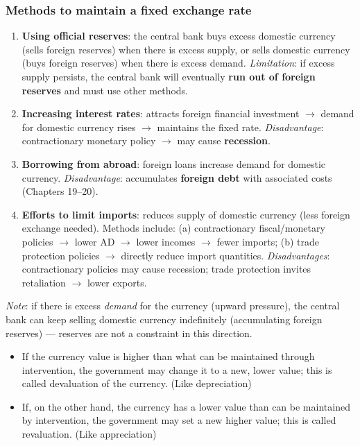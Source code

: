 \subsubsection*{Methods to maintain a fixed exchange rate}
\begin{enumerate}
  \item \textbf{Using official reserves}: the central bank buys excess domestic currency (sells foreign reserves) when there is excess supply, or sells domestic currency (buys foreign reserves) when there is excess demand. \textit{Limitation}: if excess supply persists, the central bank will eventually \textbf{run out of foreign reserves} and must use other methods.
  \item \textbf{Increasing interest rates}: attracts foreign financial investment $\to$ demand for domestic currency rises $\to$ maintains the fixed rate. \textit{Disadvantage}: contractionary monetary policy $\to$ may cause \textbf{recession}.
  \item \textbf{Borrowing from abroad}: foreign loans increase demand for domestic currency. \textit{Disadvantage}: accumulates \textbf{foreign debt} with associated costs (Chapters 19--20).
  \item \textbf{Efforts to limit imports}: reduces supply of domestic currency (less foreign exchange needed). Methods include: (a) contractionary fiscal/monetary policies $\to$ lower AD $\to$ lower incomes $\to$ fewer imports; (b) trade protection policies $\to$ directly reduce import quantities. \textit{Disadvantages}: contractionary policies may cause recession; trade protection invites retaliation $\to$ lower exports.
\end{enumerate}
\textit{Note}: if there is excess \textit{demand} for the currency (upward pressure), the central bank can keep selling domestic currency indefinitely (accumulating foreign reserves) --- reserves are not a constraint in this direction.
\begin{itemize}
  \item If the currency value is higher than what can be maintained through intervention, the government may change it to a new, lower value; this is called devaluation of the currency. (Like depreciation)
  \item If, on the other hand, the currency has a lower value than can be maintained by intervention, the government may set a new higher value; this is called revaluation. (Like appreciation)
\end{itemize}

